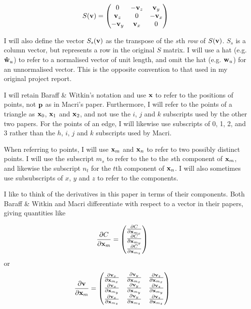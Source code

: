 \documentclass[twocolumn]{article}
\newcommand{\pfrac}[2]{
    \frac{\partial #1}{\partial #2}
}
\newcommand{\x}{{\bf x}}
\newcommand{\xm}{\x_m}
\newcommand{\xmx}{\x_{m_x}}
\newcommand{\xmy}{\x_{m_y}}
\newcommand{\xmz}{\x_{m_z}}
\newcommand{\xn}{\x_n}
\newcommand{\w}{{\bf w}}
\newcommand{\what}{{\bf {\hat w}}}
\newcommand{\wu}{\w_u}
\newcommand{\whatu}{\what_u}
\begin{document}
\[ S({\bf v}) = \begin{pmatrix}
    0 & -{\bf v}_z & {\bf v}_y \\
    {\bf v}_z & 0 & -{\bf v}_x \\
    -{\bf v}_y & {\bf v}_x & 0
    \end{pmatrix} \]

I will also define the vector $S_s({\bf v})$ as the transpose of the 
$s$th {\it row} of $S({\bf v})$. $S_s$ is a column vector, but represents
a row in the original $S$ matrix.
I will use a hat (e.g. $\whatu$) to refer to a normalised vector of unit
length, and omit the hat (e.g. $\wu$) for an unnormalised vector. This is
the opposite convention to that used in my original project report.

I will retain Baraff \& Witkin's notation and use $\x$ to refer to the
positions of points, not ${\bf p}$ as in Macri's paper. Furthermore,
I will refer to the points of a triangle as $\x_0$, $\x_1$ and $\x_2$, and
not use the $i$, $j$ and $k$ subscripts used by the other two papers. For
the points of an edge, I will likewise use subscripts of 0, 1, 2, and 3 rather
than the $h$, $i$, $j$ and $k$ subscripts used by Macri.

When referring to points, I will use $\xm$ and $\xn$ to refer to two
possibly distinct points. I will use the subscript $m_s$ to refer to the
to the $s$th component of $\xm$, and likewise the subscript $n_t$ for
the $t$th component of $\xn$. I will also sometimes use subsubscripts of $x$,
$y$ and $z$ to refer to the components.

I like to think of the derivatives in this paper in terms of their
components. Both Baraff \& Witkin and Macri differentiate with
respect to a vector in their papers, giving quantities like

\begin{align*}
    \pfrac{C}{\xm} &= \begin{pmatrix}
        \pfrac{C}{\xmx} \\ \pfrac{C}{\xmy} \\ \pfrac{C}{\xmz}
    \end{pmatrix}
\end{align*}
or
\begin{align*}
    \pfrac{{\bf v}}{\xm} &= \begin{pmatrix}
        \pfrac{{\bf v}_x}{\xmx} & \pfrac{{\bf v}_y}{\xmx} &
            \pfrac{{\bf v}_z}{\xmx} \\
        \pfrac{{\bf v}_x}{\xmy} & \pfrac{{\bf v}_y}{\xmy} &
            \pfrac{{\bf v}_z}{\xmy} \\
        \pfrac{{\bf v}_x}{\xmz} & \pfrac{{\bf v}_y}{\xmz} &
            \pfrac{{\bf v}_z}{\xmz}
    \end{pmatrix}
\end{align*}
\end{document}
